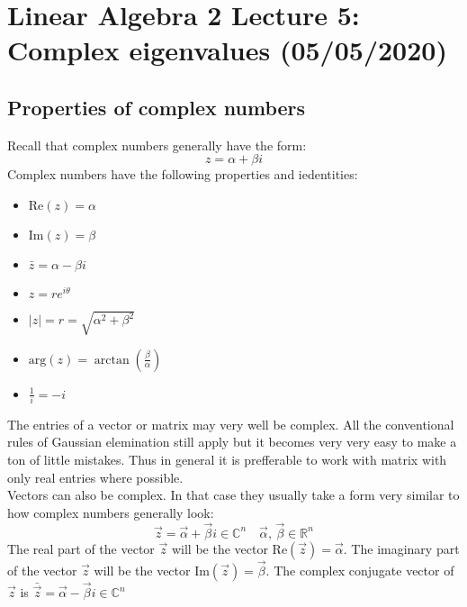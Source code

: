 \documentclass[11pt, a4paper]{article}
\newcommand*{\Rea}{\ensuremath{\text{Re}}}
\newcommand*{\Ima}{\ensuremath{\text{Im}}}
\newcommand*{\R}{\ensuremath{\mathbb{R}}}
\newcommand*{\C}{\ensuremath{\mathbb{C}}}
\begin{document}
\setcounter{equation}{0}
\setcounter{section}{4}
\section{Linear Algebra 2 Lecture 5: Complex eigenvalues (05/05/2020)}


\subsection{Properties of complex numbers}
Recall that complex numbers generally have the form:
\begin{equation}
  z = \alpha + \beta i
\end{equation}
Complex numbers have the following properties and iedentities:
\begin{itemize}
  \item $\Rea(z) = \alpha$
  \item $\Ima(z) = \beta$
  \item $\bar{z} = \alpha - \beta i$
  \item $z = r e^{i\theta}$
  \item $|z| = r =\sqrt{\alpha^2 + \beta^2}$
  \item $\text{arg}(z) = \arctan \left(\frac{\beta}{\alpha} \right)$
  \item $\frac{1}{i} = -i$
\end{itemize}
The entries of a vector or matrix may very well be complex. All the conventional rules of Gaussian elemination still apply but it becomes very very easy to make a ton of little mistakes. Thus in general it is prefferable to work with matrix with only real entries where possible.\\
Vectors can also be complex. In that case they usually take a form very similar to how complex numbers generally look:
\begin{equation}
  \vec{z} = \vec{\alpha} + \vec{\beta}i \in \C^n \quad \vec{\alpha},\, \vec{\beta} \in \R^n
\end{equation}
The real part of the vector $\vec{z}$ will be the vector $\Rea(\vec{z}) = \vec{\alpha}$. The imaginary part of the vector $\vec{z}$ will be the vector $\Ima(\vec{z}) = \vec{\beta}$. The complex conjugate vector of $\vec{z}$ is $\bar{\vec{z}} = \vec{\alpha} - \vec{\beta}i \in \C^n$
\end{document}
